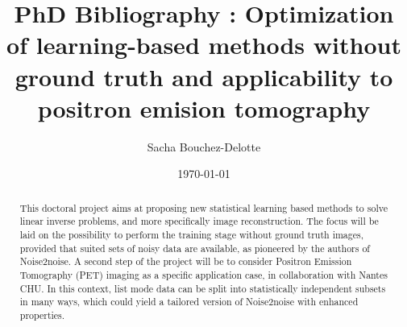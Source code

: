 \documentclass[12pt,a4paper]{article}
\title{PhD Bibliography : Optimization of learning-based methods without ground truth and applicability to positron emision tomography}
\author{Sacha Bouchez-Delotte}
\date{\today}
\begin{document}
\maketitle

\newpage
\tableofcontents
\newpage

\begin{abstract}
This doctoral project aims at proposing new statistical learning based methods to solve linear inverse problems, and more specifically image reconstruction. The focus will be laid on the possibility to perform the training stage without ground truth images, provided that suited sets of noisy data are available, as pioneered by the authors of Noise2noise. A second step of the project will be to consider Positron Emission Tomography (PET) imaging as a specific application case, in collaboration with Nantes CHU. In this context, list mode data can be split into statistically independent subsets in many ways, which could yield a tailored version of Noise2noise with enhanced properties.
\end{abstract}

\newpage





\newpage





% 

\newpage



\newpage




% 

\newpage
\printbibliography
\end{document}
